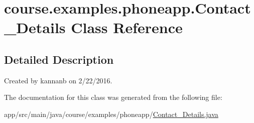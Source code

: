 \hypertarget{classcourse_1_1examples_1_1phoneapp_1_1_contact___details}{}\section{course.\+examples.\+phoneapp.\+Contact\+\_\+\+Details Class Reference}
\label{classcourse_1_1examples_1_1phoneapp_1_1_contact___details}


\subsection{Detailed Description}
Created by kannanb on 2/22/2016. 

The documentation for this class was generated from the following file\+:\begin{DoxyCompactItemize}
\item 
app/src/main/java/course/examples/phoneapp/\hyperlink{_contact___details_8java}{Contact\+\_\+\+Details.\+java}\end{DoxyCompactItemize}
